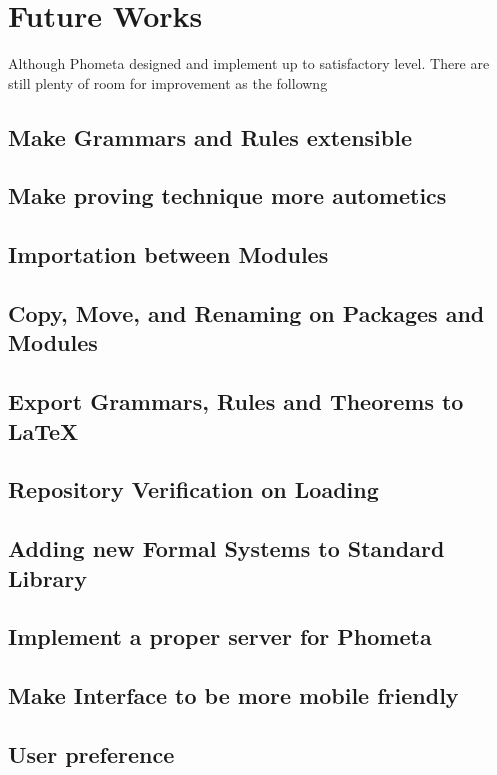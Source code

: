 \documentclass[master.tex]{subfiles}
\begin{document}
\section{Future Works}

Although Phometa designed and implement up to satisfactory level. There are
still plenty of room for improvement as the followng

\subsection{Make Grammars and Rules extensible}
\subsection{Make proving technique more autometics}
\subsection{Importation between Modules}
\subsection{Copy, Move, and Renaming on Packages and Modules}
\subsection{Export Grammars, Rules and Theorems to \LaTeX}
\subsection{Repository Verification on Loading}
\subsection{Adding new Formal Systems to Standard Library}
\subsection{Implement a proper server for Phometa}
\subsection{Make Interface to be more mobile friendly}
\subsection{User preference}
\end{document}
